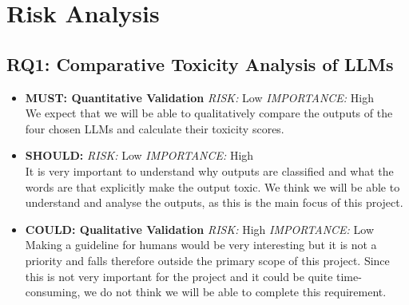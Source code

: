 \section{Risk Analysis}

\subsection{RQ1: Comparative Toxicity Analysis of LLMs}

\begin{itemize}
    \item \textbf{MUST: Quantitative Validation} \textit{RISK:} Low  \textit{IMPORTANCE:} High \\
        We expect that we will be able to qualitatively compare the outputs of the four chosen LLMs and calculate their toxicity scores.
    \item\textbf{SHOULD: } \textit{RISK:} Low  \textit{IMPORTANCE:} High \\
        It is very important to understand why outputs are classified and what the words are that explicitly make the output toxic. We think we will be able to understand and analyse the outputs, as this is the main focus of this project.
    \item \textbf{COULD: Qualitative Validation} \textit{RISK:} High  \textit{IMPORTANCE:} Low \\
        Making a guideline for humans would be very interesting but it is not a priority and falls therefore outside the primary scope of this project. Since this is not very important for the project and it could be quite time-consuming, we do not think we will be able to complete this requirement.
\end{itemize}

